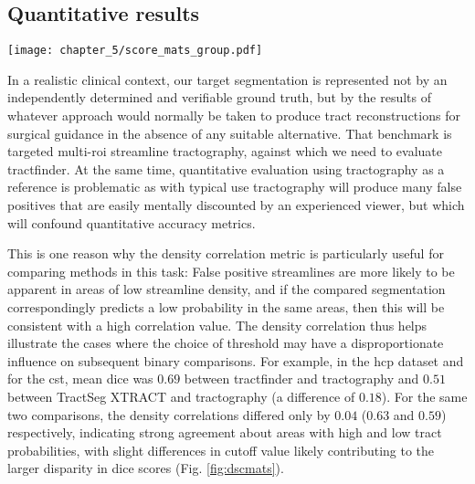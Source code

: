\subsection{Quantitative results}\label{sec:quant}

\begin{SCfigure}
  \texttt{[image: chapter\_5/score\_mats\_group.pdf]}
  \caption[Pairwise DSC and density correlations for the \textit{TractoInferno}, HCP, and clinical datasets]{Pairwise \gls{dice} and density correlations for the \textit{TractoInferno} (top) HCP49 (middle) and clinical (bottom) datasets. For each pair of methods, the metric distributions across all subjects are shown for each tract (from left to right: \gls{af}, \gls{cst}, \gls{ifof}, \gls{or}), with background colours corresponding to mean score value. 
  \label{fig:dscmats}}
\end{SCfigure}

In a realistic clinical context, our target segmentation is represented not by an independently determined and verifiable ground truth, but by the results of whatever approach would normally be taken to produce tract reconstructions for surgical guidance in the absence of any suitable alternative.
That benchmark is targeted multi-\gls{roi} streamline tractography, against which we need to evaluate tractfinder.
At the same time, quantitative evaluation using tractography as a reference is problematic as with typical use tractography will produce many false positives that are easily mentally discounted by an experienced viewer, but which will confound quantitative accuracy metrics.

This is one reason why the density correlation metric is particularly useful for comparing methods in this task:
False positive streamlines are more likely to be apparent in areas of low streamline density, and if the compared segmentation correspondingly predicts a low probability in the same areas, then this will be consistent with a high correlation value.
The density correlation thus helps illustrate the cases where the choice of threshold may have a disproportionate influence on subsequent binary comparisons.
For example, in the \gls{hcp} dataset and for the \gls{cst}, mean \gls{dice} was $0.69$ between tractfinder and tractography and $0.51$ between TractSeg XTRACT and tractography (a difference of $0.18$).
For the same two comparisons, the density correlations differed only by $0.04$ ($0.63$ and $0.59$) respectively, indicating strong agreement about areas with high and low tract probabilities, with slight differences in cutoff value likely contributing to the larger disparity in \gls{dice} scores (Fig. \ref{fig:dscmats}).

